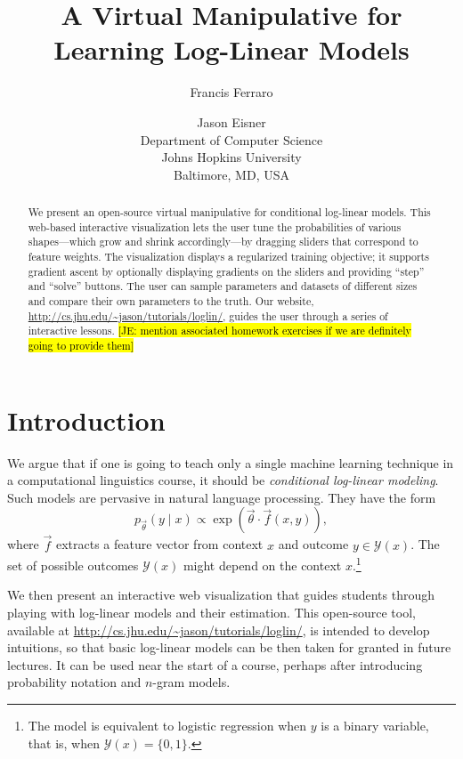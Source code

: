 \documentclass[11pt,letterpaper]{article}
\title{A Virtual Manipulative for Learning Log-Linear Models}
\author{
Francis Ferraro \and Jason Eisner\\
Department of Computer Science\\
Johns Hopkins University\\
Baltimore, MD, USA
}
\date{}
\newcommand{\Note}[1]{}
\renewcommand{\Note}[1]{\hl{[#1]}}  %
\newcommand{\NoteSigned}[3]{{\sethlcolor{#2}\Note{#1: #3}}}
\newcommand{\NoteJE}[1]{\NoteSigned{JE}{LightGreen}{#1}}
\newcommand{\WhereToFind}[0]{\url{http://cs.jhu.edu/~jason/tutorials/loglin/}}
\begin{document}
\maketitle

\begin{abstract}
  We present an open-source virtual manipulative for conditional
  log-linear models. This web-based interactive visualization lets
  the user tune the probabilities of various shapes---which grow and
  shrink accordingly---by dragging sliders that correspond to feature
  weights.  The visualization displays a regularized training
  objective; it supports gradient ascent by optionally displaying
  gradients on the sliders and providing ``step'' and ``solve''
  buttons.  The user can sample parameters and datasets of
  different sizes and compare their own parameters to the truth.  Our
  website, \WhereToFind{}, guides the user through a series of
  interactive lessons.%
  \NoteJE{mention associated homework exercises if we are
    definitely going to provide them}
\end{abstract}

\section{Introduction}\label{sec:intro}
We argue that if one is going to teach only a single machine learning
technique in a computational linguistics course, it should be {\em
  conditional log-linear modeling}.  Such models are pervasive in
natural language processing.  They have the form
\begin{equation}\label{eqn:loglin}
p_{\vec{\theta}}(y \mid x) \propto \exp{\left(\vec{\theta} \cdot \vec{f}\left(x,y\right)\right)},
\end{equation}
where $\vec{f}$ extracts a feature vector from context $x$ and
outcome $y \in \mathcal{Y}(x)$.  The set of possible
outcomes $\mathcal{Y}(x)$ might depend on the context
$x$.\footnote{The model is equivalent to logistic regression
  when $y$ is a binary variable, that is, when $\mathcal{Y}(x)=\{0,1\}$.}

We then present an interactive web visualization that guides students
through playing with log-linear models and their estimation. This open-source 
tool, available at \WhereToFind{}, is intended to develop intuitions, so that basic
log-linear models can be then taken for granted in future lectures.  It can be used near
the start of a course, perhaps after introducing probability notation
and $n$-gram models.
\end{document}
